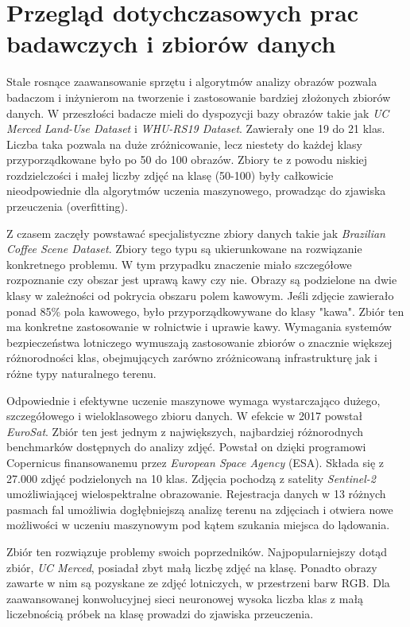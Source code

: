 \documentclass[12pt, a4paper]{report}
\begin{document}
\section{Przegląd dotychczasowych prac badawczych i zbiorów danych}
\par Stale rosnące zaawansowanie sprzętu i algorytmów analizy obrazów pozwala badaczom i inżynierom na tworzenie i zastosowanie bardziej złożonych zbiorów danych. W przeszłości badacze mieli do dyspozycji bazy obrazów takie jak \emph{UC Merced Land-Use Dataset} i \emph{WHU-RS19 Dataset}. \cite{cheng_remote_sensing} Zawierały one 19 do 21 klas. Liczba taka pozwala na duże zróżnicowanie, lecz niestety do każdej klasy przyporządkowane było po 50 do 100 obrazów. Zbiory te z powodu niskiej rozdzielczości i małej liczby zdjęć na klasę (50-100) były całkowicie nieodpowiednie dla algorytmów uczenia maszynowego, prowadząc do zjawiska przeuczenia (overfitting).
\par Z czasem zaczęły powstawać specjalistyczne zbiory danych takie jak \emph{Brazilian Coffee Scene Dataset}. Zbiory tego typu są ukierunkowane na rozwiązanie konkretnego problemu. W tym przypadku znaczenie miało szczegółowe rozpoznanie czy obszar jest uprawą kawy czy nie. Obrazy są podzielone na dwie klasy w zależności od pokrycia obszaru polem kawowym. Jeśli zdjęcie zawierało ponad 85\% pola kawowego, było przyporządkowywane do klasy "kawa". Zbiór ten ma konkretne zastosowanie w rolnictwie i uprawie kawy. Wymagania systemów bezpieczeństwa lotniczego wymuszają zastosowanie zbiorów o znacznie większej różnorodności klas, obejmujących zarówno zróżnicowaną infrastrukturę jak i różne typy naturalnego terenu.
\par Odpowiednie i efektywne uczenie maszynowe wymaga wystarczająco dużego, szczegółowego i wieloklasowego zbioru danych. W efekcie w 2017 powstał \emph{EuroSat}. \cite{helber_euroSat} Zbiór ten jest jednym z największych, najbardziej różnorodnych benchmarków dostępnych do analizy zdjęć. Powstał on dzięki programowi Copernicus finansowanemu przez \emph{European Space Agency} (ESA). Składa się z 27.000 zdjęć podzielonych na 10 klas. Zdjęcia pochodzą z satelity \emph{Sentinel-2} umożliwiającej wielospektralne obrazowanie. Rejestracja danych w 13 różnych pasmach fal umożliwia dogłębniejszą analizę terenu na zdjęciach i otwiera nowe możliwości w uczeniu maszynowym pod kątem szukania miejsca do lądowania. 
\par Zbiór ten rozwiązuje problemy swoich poprzedników. Najpopularniejszy dotąd zbiór, \emph{UC Merced}, posiadał zbyt małą liczbę zdjęć na klasę. Ponadto obrazy zawarte w nim są pozyskane ze zdjęć lotniczych, w przestrzeni barw RGB. Dla zaawansowanej konwolucyjnej sieci neuronowej wysoka liczba klas z małą liczebnością próbek na klasę prowadzi do zjawiska przeuczenia. 
\end{document}
